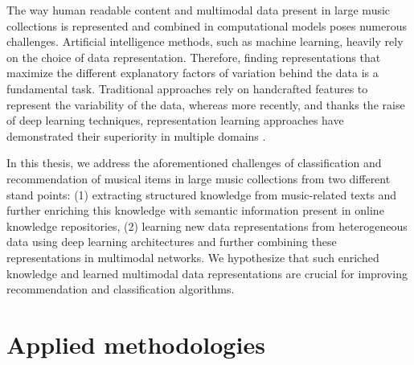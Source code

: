 
The way human readable content and multimodal data present in large music collections is represented and combined in computational models poses numerous challenges. Artificial intelligence methods, such as machine learning, heavily rely on the choice of data representation. Therefore, finding representations that maximize the different explanatory factors of variation behind the data is a fundamental task. Traditional approaches rely on handcrafted features to represent the variability of the data, whereas more recently, and thanks the raise of deep learning techniques, representation learning approaches have demonstrated their superiority in multiple domains \citep{bengio2013representation}.

In this thesis, we address the aforementioned challenges of classification and recommendation of musical items in large music collections from two different stand points: (1) extracting structured knowledge from music-related texts and further enriching this knowledge with semantic information present in online knowledge repositories, (2) learning new data representations from heterogeneous data using deep learning architectures and further combining these representations in multimodal networks. %
We hypothesize that such enriched knowledge and learned multimodal data representations are crucial for improving recommendation and classification algorithms. %

\section{Applied methodologies}

